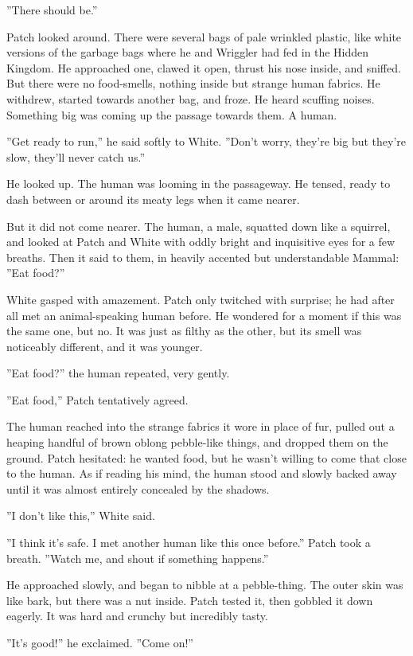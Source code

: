 \documentclass[12pt]{book}
\begin{document}
''There should be.''

Patch looked around. There were several bags of pale wrinkled plastic, like white versions of the garbage bags where he and Wriggler had fed in the Hidden Kingdom. He approached one, clawed it open, thrust his nose inside, and sniffed. But there were no food-smells, nothing inside but strange human fabrics. He withdrew, started towards another bag, and froze. He heard scuffing noises. Something big was coming up the passage towards them. A human.

''Get ready to run,'' he said softly to White. ''Don't worry, they're big but they're slow, they'll never catch us.''

He looked up. The human was looming in the passageway. He tensed, ready to dash between or around its meaty legs when it came nearer.

But it did not come nearer. The human, a male, squatted down like a squirrel, and looked at Patch and White with oddly bright and inquisitive eyes for a few breaths. Then it said to them, in heavily accented but understandable Mammal: ''Eat food?''

White gasped with amazement. Patch only twitched with surprise; he had after all met an animal-speaking human before. He wondered for a moment if this was the same one, but no. It was just as filthy as the other, but its smell was noticeably different, and it was younger.

''Eat food?'' the human repeated, very gently.

''Eat food,'' Patch tentatively agreed.

The human reached into the strange fabrics it wore in place of fur, pulled out a heaping handful of brown oblong pebble-like things, and dropped them on the ground. Patch hesitated: he wanted food, but he wasn't willing to come that close to the human. As if reading his mind, the human stood and slowly backed away until it was almost entirely concealed by the shadows.

''I don't like this,'' White said.

''I think it's safe. I met another human like this once before.'' Patch took a breath. ''Watch me, and shout if something happens.''

He approached slowly, and began to nibble at a pebble-thing. The outer skin was like bark, but there was a nut inside. Patch tested it, then gobbled it down eagerly. It was hard and crunchy but incredibly tasty.

''It's good!'' he exclaimed. ''Come on!''
\end{document}

